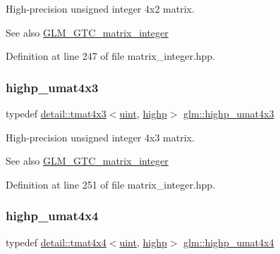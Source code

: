 High-\/precision unsigned integer 4x2 matrix. \begin{DoxySeeAlso}{See also}
\hyperlink{group__gtc__matrix__integer}{G\+L\+M\+\_\+\+G\+T\+C\+\_\+matrix\+\_\+integer} 
\end{DoxySeeAlso}


Definition at line 247 of file matrix\+\_\+integer.\+hpp.

\mbox{\label{group__gtc__matrix__integer_ga763a36c57b6073ca3cac739bfbe794ba}} 
\subsubsection{\texorpdfstring{highp\+\_\+umat4x3}{highp\_umat4x3}}
{\footnotesize\ttfamily typedef \hyperlink{structglm_1_1detail_1_1tmat4x3}{detail\+::tmat4x3}$<$\hyperlink{group__core__precision_ga4fd29415871152bfb5abd588334147c8}{uint}, \hyperlink{namespaceglm_a0f04f086094c747d227af4425893f545ac6f7eab42eacbb10d59a58e95e362074}{highp}$>$ \hyperlink{group__gtc__matrix__integer_ga763a36c57b6073ca3cac739bfbe794ba}{glm\+::highp\+\_\+umat4x3}}

High-\/precision unsigned integer 4x3 matrix. \begin{DoxySeeAlso}{See also}
\hyperlink{group__gtc__matrix__integer}{G\+L\+M\+\_\+\+G\+T\+C\+\_\+matrix\+\_\+integer} 
\end{DoxySeeAlso}


Definition at line 251 of file matrix\+\_\+integer.\+hpp.

\mbox{\label{group__gtc__matrix__integer_gaa14b7029cfaf6f26384782f5ff7acddf}} 
\subsubsection{\texorpdfstring{highp\+\_\+umat4x4}{highp\_umat4x4}}
{\footnotesize\ttfamily typedef \hyperlink{structglm_1_1detail_1_1tmat4x4}{detail\+::tmat4x4}$<$\hyperlink{group__core__precision_ga4fd29415871152bfb5abd588334147c8}{uint}, \hyperlink{namespaceglm_a0f04f086094c747d227af4425893f545ac6f7eab42eacbb10d59a58e95e362074}{highp}$>$ \hyperlink{group__gtc__matrix__integer_gaa14b7029cfaf6f26384782f5ff7acddf}{glm\+::highp\+\_\+umat4x4}}

